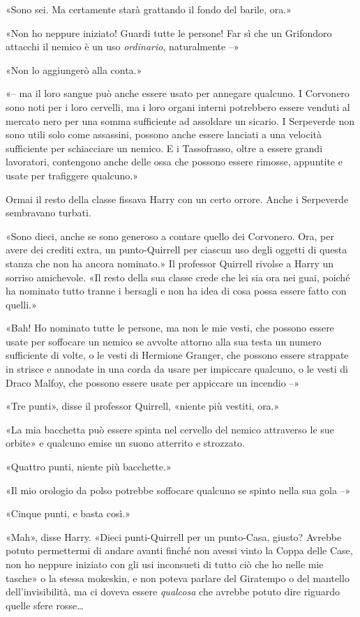 «Sono sei. Ma certamente starà grattando il fondo del barile, ora.»

«Non ho neppure iniziato! Guardi tutte le persone! Far sì che un Grifondoro attacchi il nemico è un uso \textit{ordinario}, naturalmente –»

«Non lo aggiungerò alla conta.»

«– ma il loro sangue può anche essere usato per annegare qualcuno. I Corvonero sono noti per i loro cervelli, ma i loro organi interni potrebbero essere venduti al mercato nero per una somma sufficiente ad assoldare un sicario. I Serpeverde non sono utili solo come assassini, possono anche essere lanciati a una velocità sufficiente per schiacciare un nemico. E i Tassofrasso, oltre a essere grandi lavoratori, contengono anche delle ossa che possono essere rimosse, appuntite e usate per trafiggere qualcuno.»

Ormai il resto della classe fissava Harry con un certo orrore. Anche i Serpeverde sembravano turbati.

«Sono dieci, anche se sono generoso a contare quello dei Corvonero. Ora, per avere dei crediti extra, un punto-Quirrell per ciascun uso degli oggetti di questa stanza che non ha ancora nominato.» Il professor Quirrell rivolse a Harry un sorriso amichevole. «Il resto della sua classe crede che lei sia ora nei guai, poiché ha nominato tutto tranne i bersagli e non ha idea di cosa possa essere fatto con quelli.»

«Bah! Ho nominato tutte le persone, ma non le mie vesti, che possono essere usate per soffocare un nemico se avvolte attorno alla sua testa un numero sufficiente di volte, o le vesti di Hermione Granger, che possono essere strappate in strisce e annodate in una corda da usare per impiccare qualcuno, o le vesti di Draco Malfoy, che possono essere usate per appiccare un incendio –»

«Tre punti», disse il professor Quirrell, «niente più vestiti, ora.»

«La mia bacchetta può essere spinta nel cervello del nemico attraverso le sue orbite» e qualcuno emise un suono atterrito e strozzato.

«Quattro punti, niente più bacchette.»

«Il mio orologio da polso potrebbe soffocare qualcuno se spinto nella sua gola –»

«Cinque punti, e basta così.»

«Mah», disse Harry. «Dieci punti-Quirrell per un punto-Casa, giusto? Avrebbe potuto permettermi di andare avanti finché non avessi vinto la Coppa delle Case, non ho neppure iniziato con gli usi inconsueti di tutto ciò che ho nelle mie tasche» o la stessa mokeskin, e non poteva parlare del Giratempo o del mantello dell’invisibilità, ma ci doveva essere \textit{qualcosa} che avrebbe potuto dire riguardo quelle sfere rosse…

